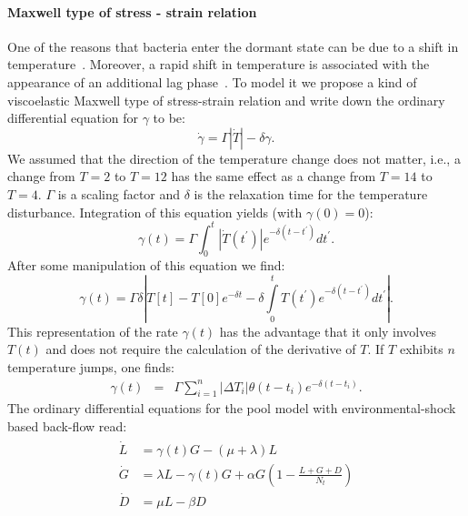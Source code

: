\documentclass[10pt,A4paper]{article}
\numberwithin{equation}{section}
\begin{document}
\paragraph{Maxwell type of stress - strain relation}
One of the reasons that bacteria enter the dormant state can be due to a shift in temperature~\cite{oliver_viable_1995}.
Moreover, a rapid shift in temperature is associated with the appearance of an additional lag phase~\cite{zwietering_modeling_1994}.
To model it we propose a kind of viscoelastic Maxwell type of stress-strain relation and write down the ordinary differential equation for $\gamma$ to be:
\begin{equation}
    \dot{\gamma} = \Gamma |\dot{T}|-\delta \gamma.
\end{equation}
We assumed that the direction of the temperature change does not matter, i.e., a change from $T=2$ to $T=12$ has the same effect as a change from $T=14$ to $T=4$.
$\Gamma$ is a scaling factor and $\delta$ is the relaxation time for the temperature disturbance.
Integration of this equation yields (with $\gamma(0)=0$):
\begin{equation}
    \gamma(t) = \Gamma \int_0^t |\dot{T}(t^{\prime})|e^{-\delta (t-t^{\prime})}dt^{\prime}.
\end{equation}
After some manipulation of this equation we find:
\begin{equation}
    \gamma(t) = \Gamma\delta\left |T[t]-T[0]e^{-\delta t}-\delta
        \int\limits_0^t T(t^{\prime})e^{-\delta (t-t^{\prime})}dt^{\prime}\right |.
\end{equation}
This representation of the rate $\gamma(t)$ has the advantage that it only involves $T(t)$ and does not require the calculation of the derivative of $T$.
If $T$ exhibits $n$ temperature jumps, one finds:
\begin{eqnarray}
    \gamma(t) &=& \Gamma\sum_{i=1}^n \left |\Delta T_i \right |\theta(t-t_i)e^{-\delta(t-t_i)}.
\label{eq:gamma_tempshift}
\end{eqnarray}
%
The ordinary differential equations for the pool model with environmental-shock based back-flow read:
\begin{align}
    \begin{split}
        \dot{L} &=\gamma(t) G - (\mu + \lambda) L\\
        \dot{G} &= \lambda L -\gamma(t) G + \alpha G\left(1-\frac{L+G+D}{N_t}\right)\\
        \dot{D} &= \mu  L - \beta D
    \end{split}
\label{eq:ode_tempshift_backlag}
\end{align}
\end{document}
